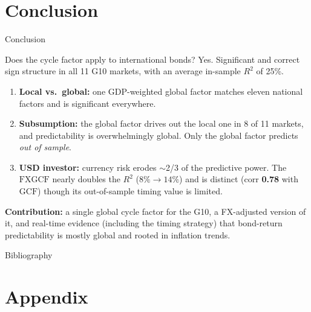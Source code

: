 \documentclass[10pt]{beamer}
\newcommand{\GCF}{\mathrm{GCF}}
\newcommand{\FXGCF}{\mathrm{FXGCF}}
\begin{document}
\section{Conclusion}

\begin{frame}{Conclusion}
  \begin{block}{Does the \citet{cieslak2015} cycle factor apply to
      international bonds? Yes.}
    Significant and correct sign structure in all 11 G10 markets, with an average in-sample
    $R^{2}$ of 25\%.
  \end{block}
  \begin{enumerate}
    \item \textbf{Local vs.\ global:} one GDP-weighted global factor matches
      eleven national factors and is significant everywhere.
    \item \textbf{Subsumption:} the global factor drives out the local one in
      8 of 11 markets, and predictability is overwhelmingly global. Only
      the global factor predicts \emph{out of sample}.
    \item \textbf{USD investor:} currency risk erodes $\sim$2/3 of the
      predictive power. The $\FXGCF$ nearly doubles the $R^{2}$ ($8\%\to14\%$) and is distinct (corr
      \textbf{0.78} with $\GCF$) though its out-of-sample timing value is limited.
  \end{enumerate}
  \vfill
  \textbf{Contribution:} a single global cycle factor for the G10, a
  FX-adjusted version of it, and real-time evidence (including the timing
  strategy) that bond-return predictability is mostly global and rooted in
  inflation trends.
\end{frame}

\begin{frame}{Bibliography}
  \small
  
\end{frame}

\appendix
\section{Appendix}
\end{document}
